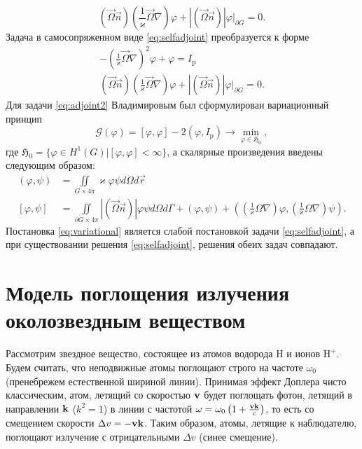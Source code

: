 \begin{equation}
(\vec \Omega \vec n)\left(\frac{1}{\varkappa}\vec \Omega\nabla\right)\varphi + |(\vec \Omega \vec n)|\varphi\Big|_{\partial G} = 0.
\label{eq:bcuniform}
\end{equation}
Задача в самосопряженном виде \eqref{eq:selfadjoint} преобразуется к форме
\begin{equation}
\begin{gathered}
-\left(\frac{1}{\varkappa}\vec \Omega \nabla\right)^2 \varphi + \varphi = I_\text{p}\\
(\vec \Omega \vec n)\left(\frac{1}{\varkappa}\vec \Omega\nabla\right)\varphi + |(\vec \Omega \vec n)|\varphi\Big|_{\partial G} = 0.
\label{eq:adjoint2}
\end{gathered}
\end{equation}
Для задачи \eqref{eq:adjoint2} Владимировым был сформулирован вариационный принцип \cite{vladimirov1961}
\begin{equation}
\mathcal{G}(\varphi) = [\varphi, \varphi] - 2(\varphi, I_\text{p}) \rightarrow \min_{\varphi \in \mathfrak{H}_0},
\label{eq:variational}
\end{equation}
где $\mathfrak{H}_0 = \Big\{\varphi \in H^{1}(G)\Big| [\varphi, \varphi] < \infty \Big\}$, а скалярные произведения введены следующим образом:
\[
\begin{aligned}
(\varphi,\psi) &= \iint\limits_{G \times 4\pi} \varkappa \varphi \psi d\Omega d\vec r\\
[\varphi,\psi] &= \iint\limits_{\partial G \times 4\pi} |(\vec \Omega \vec n)| \varphi \psi d\Omega d \Gamma + (\varphi, \psi) + 
\left(\left(\frac{1}{\varkappa}\Omega \nabla\right) \varphi, \left(\frac{1}{\varkappa}\Omega \nabla\right) \psi\right).
\end{aligned}
\]
Постановка \eqref{eq:variational} является слабой постановкой задачи \eqref{eq:selfadjoint}, а при существовании решения \eqref{eq:selfadjoint}, решения обеих задач совпадают.

\section{Модель поглощения излучения околозвездным веществом}
Рассмотрим звездное вещество, состоящее из атомов водорода H и ионов $\text{H}^+$. Будем считать, что неподвижные атомы поглощают строго на частоте $\omega_0$ (пренебрежем естественной шириной линии). Принимая эффект Доплера чисто классическим, атом, летящий со скоростью $\boldsymbol{\mathbf{v}}$ будет поглощать фотон, летящий в направлении $\boldsymbol{\mathbf{k}}$ ($k^2 = 1$) в линии с частотой $\omega = \omega_0\left(1 + \frac{\boldsymbol{\mathbf{v}}\boldsymbol{\mathbf{k}}}{c}\right)$, то есть со смещением скорости $\Delta v = -\boldsymbol{\mathbf{v}}\boldsymbol{\mathbf{k}}$. Таким образом, атомы, летящие к наблюдателю, поглощают излучение с отрицательными $\Delta v$ (синее смещение).

